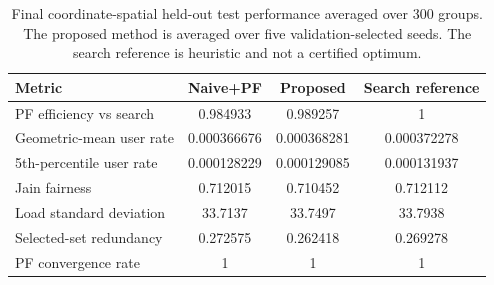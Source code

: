 \begin{table}[t]
\centering
\caption{Final coordinate-spatial held-out test performance averaged over 300 groups. The proposed method is averaged over five validation-selected seeds. The search reference is heuristic and not a certified optimum.}
\label{tab:spatial_final_test}
\begin{tabular}{lccc}
\toprule
Metric & Naive+PF & Proposed & Search reference \\
\midrule
PF efficiency vs search & 0.984933 & 0.989257 & 1 \\
Geometric-mean user rate & 0.000366676 & 0.000368281 & 0.000372278 \\
5th-percentile user rate & 0.000128229 & 0.000129085 & 0.000131937 \\
Jain fairness & 0.712015 & 0.710452 & 0.712112 \\
Load standard deviation & 33.7137 & 33.7497 & 33.7938 \\
Selected-set redundancy & 0.272575 & 0.262418 & 0.269278 \\
PF convergence rate & 1 & 1 & 1 \\
\bottomrule
\end{tabular}
\end{table}